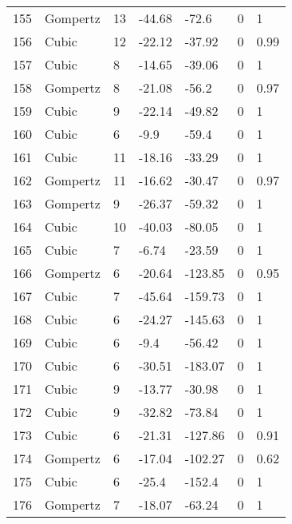 \documentclass[11pt]{article}
\begin{document}
\begin{center}
\begin{longtable}{lllllll}
        155 & Gompertz  & 13              & -44.68  & -72.6   & 0       & 1    \\
        156 & Cubic     & 12              & -22.12  & -37.92  & 0       & 0.99 \\
        157 & Cubic     & 8               & -14.65  & -39.06  & 0       & 1    \\
        158 & Gompertz  & 8               & -21.08  & -56.2   & 0       & 0.97 \\
        159 & Cubic     & 9               & -22.14  & -49.82  & 0       & 1    \\
        160 & Cubic     & 6               & -9.9    & -59.4   & 0       & 1    \\
        161 & Cubic     & 11              & -18.16  & -33.29  & 0       & 1    \\
        162 & Gompertz  & 11              & -16.62  & -30.47  & 0       & 0.97 \\
        163 & Gompertz  & 9               & -26.37  & -59.32  & 0       & 1    \\
        164 & Cubic     & 10              & -40.03  & -80.05  & 0       & 1    \\
        165 & Cubic     & 7               & -6.74   & -23.59  & 0       & 1    \\
        166 & Gompertz  & 6               & -20.64  & -123.85 & 0       & 0.95 \\
        167 & Cubic     & 7               & -45.64  & -159.73 & 0       & 1    \\
        168 & Cubic     & 6               & -24.27  & -145.63 & 0       & 1    \\
        169 & Cubic     & 6               & -9.4    & -56.42  & 0       & 1    \\
        170 & Cubic     & 6               & -30.51  & -183.07 & 0       & 1    \\
        171 & Cubic     & 9               & -13.77  & -30.98  & 0       & 1    \\
        172 & Cubic     & 9               & -32.82  & -73.84  & 0       & 1    \\
        173 & Cubic     & 6               & -21.31  & -127.86 & 0       & 0.91 \\
        174 & Gompertz  & 6               & -17.04  & -102.27 & 0       & 0.62 \\
        175 & Cubic     & 6               & -25.4   & -152.4  & 0       & 1    \\
        176 & Gompertz  & 7               & -18.07  & -63.24  & 0       & 1    \\

\end{longtable}
\end{center}
\end{document}
